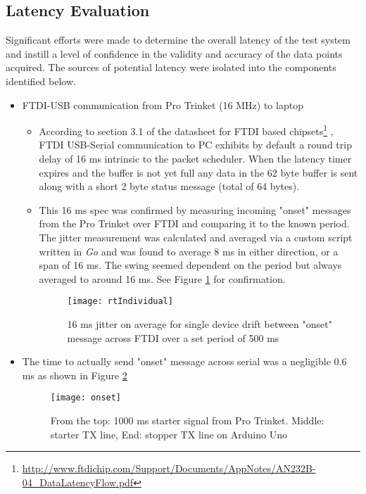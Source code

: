 \subsection{Latency Evaluation} \label{latencyCalc}
Significant efforts were made to determine the overall latency of the test system and instill a level of confidence in the validity and accuracy of the data points acquired. The sources of potential latency were isolated into the components identified below.
\begin{itemize}
    \item FTDI-USB communication from Pro Trinket (16 MHz) to laptop
    \begin{itemize}
        \item According to section 3.1 of the datasheet for FTDI based chipsets\footnote{\url{http://www.ftdichip.com/Support/Documents/AppNotes/AN232B-04_DataLatencyFlow.pdf}} , FTDI USB-Serial communication to PC exhibits by default a round trip delay of 16 ms intrinsic to the packet scheduler. When the latency timer expires and the buffer is not yet full any data in the 62 byte buffer is sent along with a short 2 byte status message (total of 64 bytes).
        \item This 16 ms spec was confirmed by measuring incoming "onset" messages from the Pro Trinket over FTDI and comparing it to the known period. The jitter measurement was calculated and averaged via a custom script written in \textit{Go} and was found to average 8 ms in either direction, or a span of 16 ms. The swing seemed dependent on the period but always averaged to around 16 ms. See Figure \ref{fig:rtIndividual} for confirmation.
        \begin{figure}[H] \label{fig:rtIndividual}
            \centering  
            \texttt{[image: rtIndividual]}
            \caption{16 ms jitter on average for single device drift between "onset" message across FTDI over a set period of 500 ms}
        \end{figure}
    \end{itemize}
    \item The time to actually send "onset" message across serial was a negligible 0.6 ms as shown in Figure \ref{fig:onsetMessage}
    \begin{figure}[H] \label{fig:onsetMessage}
        \centering
        \texttt{[image: onset]}
        \caption{From the top: 1000 ms starter signal from Pro Trinket. Middle: starter TX line, End: stopper TX line on Arduino Uno}
    \end{figure}

\end{itemize}

